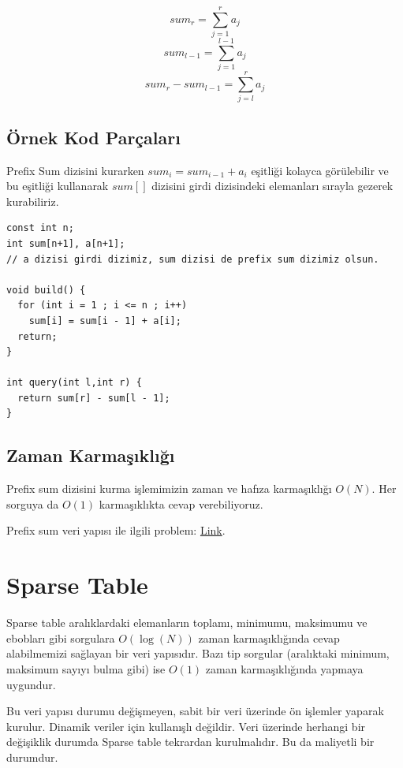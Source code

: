 \documentclass[12pt]{article}
\begin{document}
    $$sum_r = \sum_{j=1}^{r} {a_j} $$ 
    $$sum_{l - 1} = \sum_{j=1}^{l - 1} {a_j} $$ 
	$$sum_r - sum_{l-1} = \sum_{j=l}^{r} {a_j}$$
	
	\subsection{\"{O}rnek Kod Par\c{c}alar{\i}}
	
    Prefix Sum dizisini kurarken $sum_i = sum_{i -1} + a_i$ e\c{s}itli\u{g}i kolayca g\"{o}r\"{u}lebilir ve bu e\c{s}itli\u{g}i kullanarak $sum[]$ dizisini girdi dizisindeki elemanlar{\i} s{\i}rayla gezerek kurabiliriz.
	
    \begin{verbatim}
const int n;
int sum[n+1], a[n+1];
// a dizisi girdi dizimiz, sum dizisi de prefix sum dizimiz olsun.

void build() {
  for (int i = 1 ; i <= n ; i++)
    sum[i] = sum[i - 1] + a[i];
  return;
}

int query(int l,int r) {
  return sum[r] - sum[l - 1];
}
    \end{verbatim}

	\subsection{Zaman Karma\c{s}{\i}kl{\i}\u{g}{\i}}
	
    Prefix sum dizisini kurma i\c{s}lemimizin zaman ve haf{\i}za karma\c{s}{\i}kl{\i}\u{g}{\i} $O(N)$. Her sorguya da $O(1)$ karma\c{s}{\i}kl{\i}kta cevap verebiliyoruz. 

    Prefix sum veri yap{\i}s{\i} ile ilgili problem: \href{https://codeforces.com/problemset/problem/816/B}{Link}.
    \cleardoublepage

	\section{Sparse Table} \label{sparsetable}

    Sparse table aral{\i}klardaki elemanlar{\i}n toplam{\i}, minimumu, maksimumu ve eboblar{\i} gibi sorgulara $O(\log(N))$ zaman karma\c{s}{\i}kl{\i}\u{g}{\i}nda cevap alabilmemizi sa\u{g}layan bir veri yap{\i}s{\i}d{\i}r. Baz{\i} tip sorgular (aral{\i}ktaki minimum, maksimum say{\i}y{\i} bulma gibi) ise $O(1)$ zaman karma\c{s}{\i}kl{\i}\u{g}{\i}nda yapmaya uygundur.
    
    Bu veri yap{\i}s{\i} durumu de\u{g}i\c{s}meyen, sabit bir veri \"{u}zerinde \"{o}n i\c{s}lemler yaparak kurulur. Dinamik veriler i\c{c}in kullan{\i}\c{s}l{\i} de\u{g}ildir. Veri \"{u}zerinde herhangi bir de\u{g}i\c{s}iklik durumda Sparse table tekrardan kurulmal{\i}d{\i}r. Bu da maliyetli bir durumdur.
    
\end{document}
